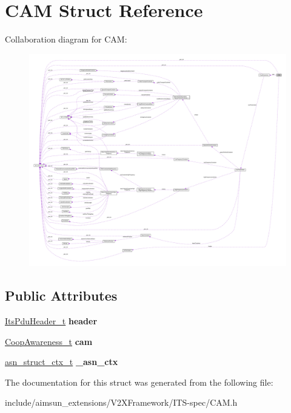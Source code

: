 \hypertarget{structCAM}{}\section{C\+AM Struct Reference}
\label{structCAM}


Collaboration diagram for C\+AM\+:\nopagebreak
\begin{figure}[H]
\begin{center}
\leavevmode
\includegraphics[width=350pt]{structCAM__coll__graph}
\end{center}
\end{figure}
\subsection*{Public Attributes}
\begin{DoxyCompactItemize}
\item 
\hyperlink{structItsPduHeader}{Its\+Pdu\+Header\+\_\+t} {\bfseries header}\hypertarget{structCAM_a60ca0b2943abd8d178d653e4ea55f96c}{}\label{structCAM_a60ca0b2943abd8d178d653e4ea55f96c}

\item 
\hyperlink{structCoopAwareness}{Coop\+Awareness\+\_\+t} {\bfseries cam}\hypertarget{structCAM_a3f337fb5369305daf9f0807f818635fc}{}\label{structCAM_a3f337fb5369305daf9f0807f818635fc}

\item 
\hyperlink{structasn__struct__ctx__s}{asn\+\_\+struct\+\_\+ctx\+\_\+t} {\bfseries \+\_\+asn\+\_\+ctx}\hypertarget{structCAM_a195d8b3b3cfb090f4de190072eeaaf09}{}\label{structCAM_a195d8b3b3cfb090f4de190072eeaaf09}

\end{DoxyCompactItemize}


The documentation for this struct was generated from the following file\+:\begin{DoxyCompactItemize}
\item 
include/aimsun\+\_\+extensions/\+V2\+X\+Framework/\+I\+T\+S-\/spec/C\+A\+M.\+h\end{DoxyCompactItemize}
